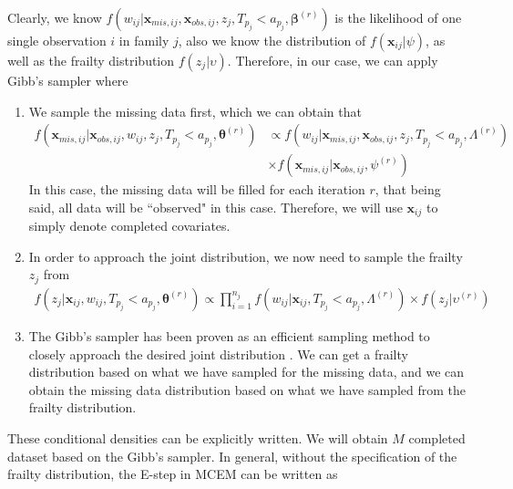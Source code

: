\documentclass[preprint,12pt]{elsarticle}
\begin{document}
Clearly, we know $f(w_{ij}|\mathbf{x}_{mis,ij}, \mathbf{x}_{obs,ij}, z_j, T_{p_j}<a_{p_j}, \boldsymbol{\beta}^{(r)})$ is the likelihood of one single observation $i$ in family $j$, also we know the distribution of $f(\mathbf{x}_{ij}|\psi)$, as well as the frailty distribution $f(z_j|\upsilon)$. 
Therefore, in our case, we can apply Gibb's sampler where 

\begin{enumerate} 
    \item We sample the missing data first, which we can obtain that 
    \begin{align} 
        f(\mathbf{x}_{mis,ij}|\mathbf{x}_{obs,ij}, w_{ij}, z_j, T_{p_j}<a_{p_j}, \boldsymbol{\theta}^{(r)})&\propto f(w_{ij}|\boldsymbol{x}_{mis,ij}, \boldsymbol{x}_{obs,ij}, z_j, T_{p_j}<a_{p_j}, \Lambda^{(r)})\\
        &\times f(\mathbf{x}_{mis,ij}|\mathbf{x}_{obs,ij},\psi^{(r)})
    \end{align}
    In this case, the missing data will be filled for each iteration $r$, that being said, all data will be ``observed" in this case. 
    Therefore, we will use $\mathbf{x}_{ij}$ to simply denote completed covariates. 
    \item In order to approach the joint distribution, we now need to sample the frailty $z_j$ from 
    \begin{align} 
        f(z_j|\mathbf{x}_{ij}, w_{ij}, T_{p_j}<a_{p_j}, \boldsymbol{\theta}^{(r)})\propto \prod_{i=1}^{n_j}f(w_{ij}|\mathbf{x}_{ij}, T_{p_j}<a_{p_j}, \Lambda^{(r)})\times f(z_j|\upsilon^{(r)})
    \end{align}
    \item The Gibb's sampler has been proven as an efficient sampling method to closely approach the desired joint distribution \cite{gelfand1990sampling}. 
    We can get a frailty distribution based on what we have sampled for the missing data, and we can obtain the missing data distribution based on what we have sampled from the frailty distribution. 
\end{enumerate}
These conditional densities can be explicitly written.
We will obtain $M$ completed dataset based on the Gibb's sampler. 
In general, without the specification of the frailty distribution, the E-step in MCEM can be written as 
\end{document}
